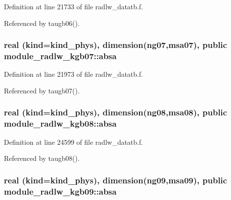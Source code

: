 Definition at line 21733 of file radlw\+\_\+datatb.\+f.



Referenced by taugb06().

\subsubsection[{\texorpdfstring{absa}{absa}}]{\setlength{\rightskip}{0pt plus 5cm}real (kind=kind\+\_\+phys), dimension(ng07,msa07), public module\+\_\+radlw\+\_\+kgb07\+::absa}\hypertarget{group__module__radlw__main_gaf106cf054f7496a092ceb0c399753a36}{}\label{group__module__radlw__main_gaf106cf054f7496a092ceb0c399753a36}


Definition at line 21973 of file radlw\+\_\+datatb.\+f.



Referenced by taugb07().

\subsubsection[{\texorpdfstring{absa}{absa}}]{\setlength{\rightskip}{0pt plus 5cm}real (kind=kind\+\_\+phys), dimension(ng08,msa08), public module\+\_\+radlw\+\_\+kgb08\+::absa}\hypertarget{group__module__radlw__main_gaba1018958264bbc6fbf7f190fea91fa5}{}\label{group__module__radlw__main_gaba1018958264bbc6fbf7f190fea91fa5}


Definition at line 24599 of file radlw\+\_\+datatb.\+f.



Referenced by taugb08().

\subsubsection[{\texorpdfstring{absa}{absa}}]{\setlength{\rightskip}{0pt plus 5cm}real (kind=kind\+\_\+phys), dimension(ng09,msa09), public module\+\_\+radlw\+\_\+kgb09\+::absa}\hypertarget{group__module__radlw__main_ga7a8726efe46fac4d6cce55ca357199ab}{}\label{group__module__radlw__main_ga7a8726efe46fac4d6cce55ca357199ab}


